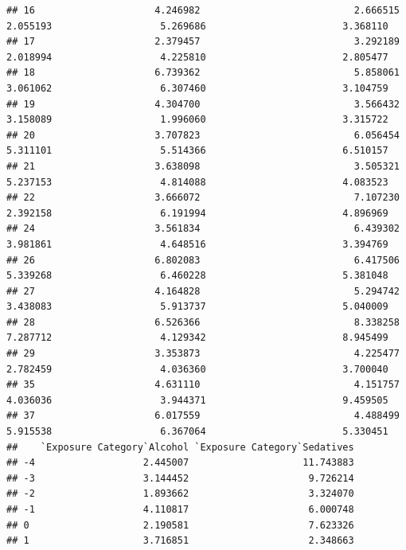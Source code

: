 \documentclass[
]{article}
\begin{document}
\begin{verbatim}
## 16                     4.246982                           2.666515                      2.055193                   5.269686                        3.368110
## 17                     2.379457                           3.292189                      2.018994                   4.225810                        2.805477
## 18                     6.739362                           5.858061                      3.061062                   6.307460                        3.104759
## 19                     4.304700                           3.566432                      3.158089                   1.996060                        3.315722
## 20                     3.707823                           6.056454                      5.311101                   5.514366                        6.510157
## 21                     3.638098                           3.505321                      5.237153                   4.814088                        4.083523
## 22                     3.666072                           7.107230                      2.392158                   6.191994                        4.896969
## 24                     3.561834                           6.439302                      3.981861                   4.648516                        3.394769
## 26                     6.802083                           6.417506                      5.339268                   6.460228                        5.381048
## 27                     4.164828                           5.294742                      3.438083                   5.913737                        5.040009
## 28                     6.526366                           8.338258                      7.287712                   4.129342                        8.945499
## 29                     3.353873                           4.225477                      2.782459                   4.036360                        3.700040
## 35                     4.631110                           4.151757                      4.036036                   3.944371                        9.459505
## 37                     6.017559                           4.488499                      5.915538                   6.367064                        5.330451
##    `Exposure Category`Alcohol `Exposure Category`Sedatives
## -4                   2.445007                    11.743883
## -3                   3.144452                     9.726214
## -2                   1.893662                     3.324070
## -1                   4.110817                     6.000748
## 0                    2.190581                     7.623326
## 1                    3.716851                     2.348663

\end{verbatim}
\end{document}
